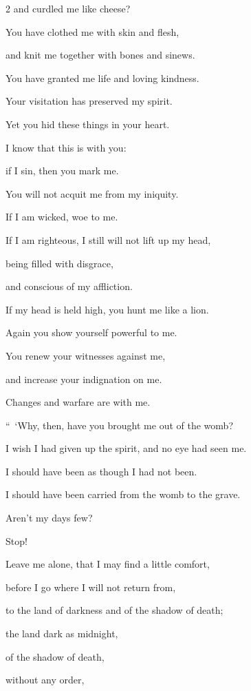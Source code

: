 \begin{multicols}{2}
	and curdled me like cheese?
	
	\myverse{}You have clothed me with skin and flesh,
	
	and knit me together with bones and sinews.
	
	\myverse{}You have granted me life and loving kindness.
	
	Your visitation has preserved my spirit.
	
	\myverse{}Yet you hid these things in your heart.
	
	I know that this is with you:
	
	\myverse{}if I sin, then you mark me.
	
	You will not acquit me from my iniquity.
	
	\myverse{}If I am wicked, woe to me.
	
	If I am righteous, I still will not lift up my head,
	
	being filled with disgrace,
	
	and conscious of my affliction.
	
	\myverse{}If my head is held high, you hunt me like a lion.
	
	Again you show yourself powerful to me.
	
	\myverse{}You renew your witnesses against me,
	
	and increase your indignation on me.
	
	Changes and warfare are with me.
	
	\vspace{\baselineskip}
	
	\myverse{}“ ‘Why, then, have you brought me out of the womb?
	
	I wish I had given up the spirit, and no eye had seen me.
	
	\myverse{}I should have been as though I had not been.
	
	I should have been carried from the womb to the grave.
	
	\myverse{}Aren’t my days few?
	
	Stop!
	
	Leave me alone, that I may find a little comfort,
	
	\myverse{}before I go where I will not return from,
	
	to the land of darkness and of the shadow of death;
	
	\myverse{}the land dark as midnight,
	
	of the shadow of death,
	
	without any order,
	

\end{multicols}
